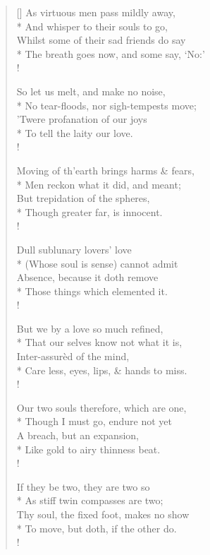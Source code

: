 \documentclass[MAIN]{subfiles}
\begin{document}
\settowidth{\versewidth}{\vin Care less, eyes, lips, \& hands to miss.}
\begin{verse}[\versewidth]
As virtuous men pass mildly away,\\*
\vin And whisper to their souls to go,\\
Whilst some of their sad friends do say\\*
\vin The breath goes now, and some say, `No:'\\!

So let us melt, and make no noise,\\*
\vin No tear-floods, nor sigh-tempests move;\\
'Twere profanation of our joys\\*
\vin To tell the laity our love.\\!

Moving of th'earth brings harms \& fears,\\*
\vin Men reckon what it did, and meant;\\
But trepidation of the spheres,\\*
\vin Though greater far, is innocent.\\!

Dull sublunary lovers' love\\*
\vin (Whose soul is sense) cannot admit\\
Absence, because it doth remove\\*
\vin Those things which elemented it.\\!

But we by a love so much refined,\\*
\vin That our selves know not what it is,\\
Inter-assur\`ed of the mind,\\*
\vin Care less, eyes, lips, \& hands to miss.\\!

Our two souls therefore, which are one,\\*
\vin Though I must go, endure not yet\\
A breach, but an expansion,\\*
\vin Like gold to airy thinness beat.\\!

If they be two, they are two so\\*
\vin As stiff twin compasses are two;\\
Thy soul, the fixed foot, makes no show\\*
\vin To move, but doth, if the other do.\\!


\end{verse}
\end{document}
